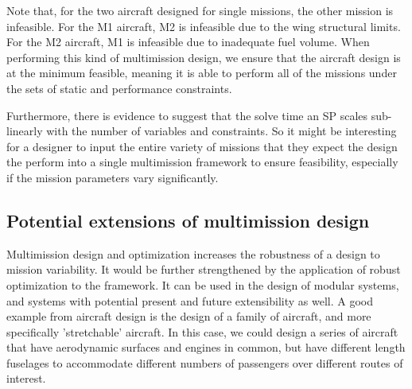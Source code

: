 \begin{center}
    
    \label{t:mmoutputs}
\end{center}

Note that, for the two aircraft designed for single missions, the other mission is infeasible. For the M1 aircraft,
M2 is infeasible due to the wing structural limits. For the M2 aircraft, M1 is infeasible due to inadequate
fuel volume. When performing this kind of multimission design, we ensure that the aircraft design is at the minimum feasible,
meaning it is able to perform all of the missions under the sets of static and performance constraints.

Furthermore, there is evidence to suggest that the solve time an \gls{SP} scales sub-linearly with the number of
variables and constraints. So it might be interesting for a designer to input the entire variety of missions that
they expect the design the perform into a single multimission framework to ensure feasibility, especially if the
mission parameters vary significantly.


\subsection{Potential extensions of multimission design}

Multimission design and optimization increases the robustness of a design to mission variability.
It would be further strengthened by the application of robust optimization to the framework. It can be used in the design
of modular systems, and systems with potential present and future extensibility as well.
A good example from aircraft design
is the design of a family of aircraft, and more specifically 'stretchable' aircraft. In
this case, we could design a series of aircraft that have aerodynamic surfaces and engines
in common, but have different length fuselages to accommodate different numbers of passengers over different
routes of interest.


